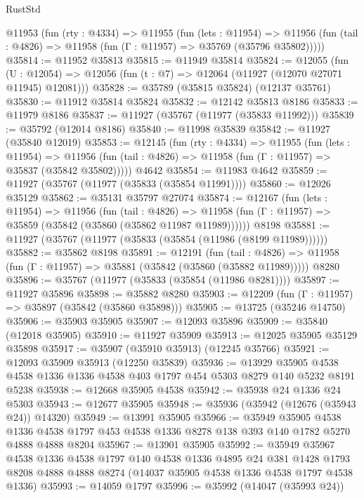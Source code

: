 \begin{lexlean}{RustStd}
\begin{coremodule}
  @11953
    (fun (rty : @4334) =>
    @11955
      (fun (lets : @11954) =>
      @11956 (fun (tail : @4826) => @11958 (fun (Γ : @11957) => @35769 (@35796 @35802)))))
@35814 := @11952 @35813
@35815 := @11949 @35814
@35824 := @12055
    (fun (U : @12054) => @12056 (fun (t : @7) => @12064 (@11927 (@12070 @27071 @11945) @12081)))
@35828 := @35789 (@35815 @35824) (@12137 @35761)
@35830 := @11912 @35814 @35824
@35832 := @12142 @35813 @8186
@35833 := @11979 @8186
@35837 := @11927 (@35767 (@11977 (@35833 @11992)))
@35839 := @35792 (@12014 @8186)
@35840 := @11998 @35839
@35842 := @11927 (@35840 @12019)
@35853 := @12145
    (fun (rty : @4334) =>
    @11955
      (fun (lets : @11954) =>
      @11956 (fun (tail : @4826) => @11958 (fun (Γ : @11957) => @35837 (@35842 @35802)))))
    @4642
@35854 := @11983 @4642
@35859 := @11927 (@35767 (@11977 (@35833 (@35854 @11991))))
@35860 := @12026 @35129
@35862 := @35131 @35797 @27074
@35874 := @12167
    (fun (lets : @11954) =>
    @11956
      (fun (tail : @4826) =>
      @11958 (fun (Γ : @11957) => @35859 (@35842 (@35860 (@35862 @11987 @11989))))))
    @8198
@35881 := @11927 (@35767 (@11977 (@35833 (@35854 (@11986 (@8199 @11989))))))
@35882 := @35862 @8198
@35891 := @12191
    (fun (tail : @4826) => @11958 (fun (Γ : @11957) => @35881 (@35842 (@35860 (@35882 @11989)))))
    @8280
@35896 := @35767 (@11977 (@35833 (@35854 (@11986 @8281))))
@35897 := @11927 @35896
@35898 := @35882 @8280
@35903 := @12209 (fun (Γ : @11957) => @35897 (@35842 (@35860 @35898)))
@35905 := @13725 (@35246 @14750)
@35906 := @35903 @35905
@35907 := @12093 @35896
@35909 := @35840 (@12018 @35905)
@35910 := @11927 @35909
@35913 := @12025 @35905 @35129 @35898
@35917 := @35907 (@35910 @35913) (@12245 @35766)
@35921 := @12093 @35909 @35913 (@12250 @35839)
@35936 := @13929
    @35905
    @4538
    @4538
    @1336
    @1336
    @4538
    @403
    @1797
    @454
    @5303
    @8279
    @140
    @5232
    @8191
    @5238
@35938 := @12668 @35905 @4538
@35942 := @35938 @24 @1336 @24 @5303
@35943 := @12677 @35905
@35948 := @35936 (@35942 (@12676 (@35943 @24)) @14320)
@35949 := @13991 @35905
@35966 := @35949
    @35905
    @4538
    @1336
    @4538
    @1797
    @453
    @4538
    @1336
    @8278
    @138
    @393
    @140
    @1782
    @5270
    @4888
    @4888
    @8204
@35967 := @13901 @35905
@35992 := @35949
    @35967
    @4538
    @1336
    @4538
    @1797
    @140
    @4538
    @1336
    @4895
    @24
    @381
    @1428
    @1793
    @8208
    @4888
    @4888
    @8274
    (@14037 @35905 @4538 @1336 @4538 @1797 @4538 @1336)
@35993 := @14059 @1797
@35996 := @35992 (@14047 (@35993 @24))

\end{coremodule}
\end{lexlean}
